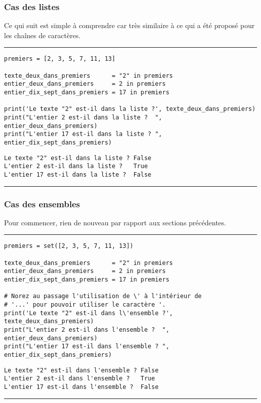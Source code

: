 \subsubsection{Cas des listes}

Ce qui suit est simple à comprendre car très similaire à ce qui a été proposé pour les chaînes de caractères.


\bigskip
{\hrule height .5mm}
\begin{verbatim}
premiers = [2, 3, 5, 7, 11, 13]

texte_deux_dans_premiers      = "2" in premiers
entier_deux_dans_premiers     = 2 in premiers
entier_dix_sept_dans_premiers = 17 in premiers

print('Le texte "2" est-il dans la liste ?', texte_deux_dans_premiers)
print("L'entier 2 est-il dans la liste ?  ", entier_deux_dans_premiers)
print("L'entier 17 est-il dans la liste ? ", entier_dix_sept_dans_premiers)
\end{verbatim}
 \color{ForestGreen}
\vspace{-1.5em}
\begin{verbatim}
Le texte "2" est-il dans la liste ? False
L'entier 2 est-il dans la liste ?   True
L'entier 17 est-il dans la liste ?  False
\end{verbatim} \color{Black}
{\hrule height .5mm}
\bigskip


\subsubsection{Cas des ensembles}

Pour commencer, rien de nouveau par rapport aux sections précédentes.


\bigskip
{\hrule height .5mm}
\begin{verbatim}
premiers = set([2, 3, 5, 7, 11, 13])

texte_deux_dans_premiers      = "2" in premiers
entier_deux_dans_premiers     = 2 in premiers
entier_dix_sept_dans_premiers = 17 in premiers

# Norez au passage l'utilisation de \' à l'intérieur de
# '...' pour pouvoir utiliser le caractère '.
print('Le texte "2" est-il dans l\'ensemble ?', texte_deux_dans_premiers)
print("L'entier 2 est-il dans l'ensemble ?  ", entier_deux_dans_premiers)
print("L'entier 17 est-il dans l'ensemble ? ", entier_dix_sept_dans_premiers)
\end{verbatim}
 \color{ForestGreen}
\vspace{-1.5em}
\begin{verbatim}
Le texte "2" est-il dans l'ensemble ? False
L'entier 2 est-il dans l'ensemble ?   True
L'entier 17 est-il dans l'ensemble ?  False
\end{verbatim} \color{Black}
{\hrule height .5mm}
\bigskip


